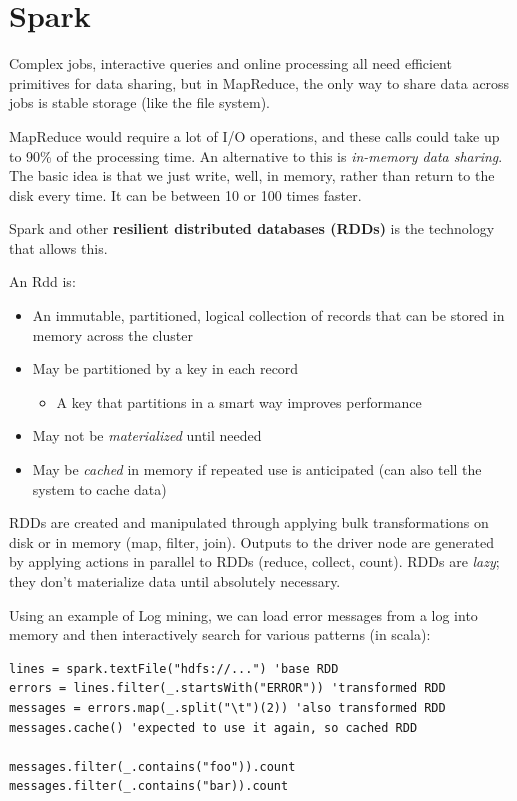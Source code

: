 \documentclass[11pt,a4paper,titlepage,dvipsnames,cmyk]{scrartcl}
\begin{document}
\section{Spark}
Complex jobs, interactive queries and online processing all need efficient primitives for data sharing, but in MapReduce, the only way to share data across jobs is stable storage (like the file system).

MapReduce would require a lot of I/O operations, and these calls could take up to 90\% of the processing time. An alternative to this is \textit{in-memory data sharing}. The basic idea is that we just write, well, in memory, rather than return to the disk every time. It can be between 10 or 100 times faster.

Spark and other \textbf{resilient distributed databases (RDDs)} is the technology that allows this.

\begin{tcolorbox} [space to upper,
collower=white,
title={RDD},
nobeforeafter,
halign lower=flush right, ]
An Rdd is:
\begin{itemize}
    \item An immutable, partitioned, logical collection of records that can be stored in memory across the cluster
    \item May be partitioned by a key in each record
    \begin{itemize}
        \item A key that partitions in a smart way improves performance
    \end{itemize}
    \item May not be \textit{materialized} until needed
    \item May be \textit{cached} in memory if repeated use is anticipated (can also tell the system to cache data)
\end{itemize}
\end{tcolorbox}

RDDs are created and manipulated through applying bulk transformations on disk or in memory (map, filter, join). Outputs to the driver node are generated by applying actions in parallel to RDDs (reduce, collect, count). RDDs are \textit{lazy}; they don't materialize data until absolutely necessary.

Using an example of Log mining, we can load error messages from a log into memory and then interactively search for various patterns (in scala):
\begin{lstlisting}
lines = spark.textFile("hdfs://...") 'base RDD
errors = lines.filter(_.startsWith("ERROR")) 'transformed RDD
messages = errors.map(_.split("\t")(2)) 'also transformed RDD
messages.cache() 'expected to use it again, so cached RDD

messages.filter(_.contains("foo")).count
messages.filter(_.contains("bar)).count
\end{lstlisting}
\end{document}
